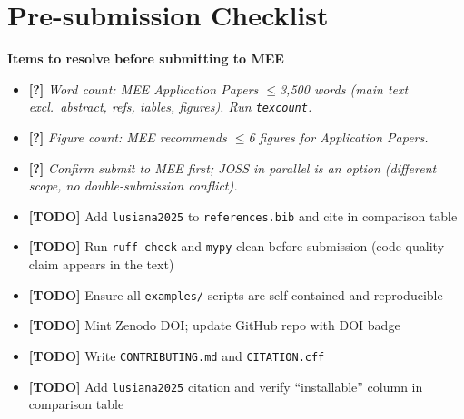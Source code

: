 \documentclass[11pt,a4paper]{article}
\newcommand{\todo}[1]{{\color{todored}\textbf{[TODO]} #1}}
\newcommand{\question}[1]{{\color{questionblue}\textbf{[?]} \textit{#1}}}
\newenvironment{scaffold}[1]{%
  \begin{mdframed}[backgroundcolor=gray!6, linecolor=gray!30,
                   leftmargin=0pt, rightmargin=0pt,
                   innerleftmargin=8pt, innerrightmargin=8pt,
                   innertopmargin=6pt, innerbottommargin=6pt]
  \noindent\textbf{#1}\par\vspace{2pt}
  \begin{itemize}[leftmargin=1.4em, topsep=2pt, itemsep=1pt, parsep=0pt]
}{%
  \end{itemize}
  \end{mdframed}
  \vspace{4pt}
}
\begin{document}
\section{Pre-submission Checklist}

\begin{scaffold}{Items to resolve before submitting to MEE}
  \item \question{Word count: MEE Application Papers $\leq$3,500 words (main
    text excl.\ abstract, refs, tables, figures). Run \texttt{texcount}.}
  \item \question{Figure count: MEE recommends $\leq$6 figures for Application
    Papers.}
  \item \question{Confirm submit to MEE first; JOSS in parallel is an option
    (different scope, no double-submission conflict).}
  \item \todo{Add \texttt{lusiana2025} to \texttt{references.bib} and cite
    in comparison table}
  \item \todo{Run \texttt{ruff check} and \texttt{mypy} clean before
    submission (code quality claim appears in the text)}
  \item \todo{Ensure all \texttt{examples/} scripts are self-contained and
    reproducible}
  \item \todo{Mint Zenodo DOI; update GitHub repo with DOI badge}
  \item \todo{Write \texttt{CONTRIBUTING.md} and \texttt{CITATION.cff}}
  \item \todo{Add \texttt{lusiana2025} citation and verify ``installable''
    column in comparison table}
\end{scaffold}




\end{document}
